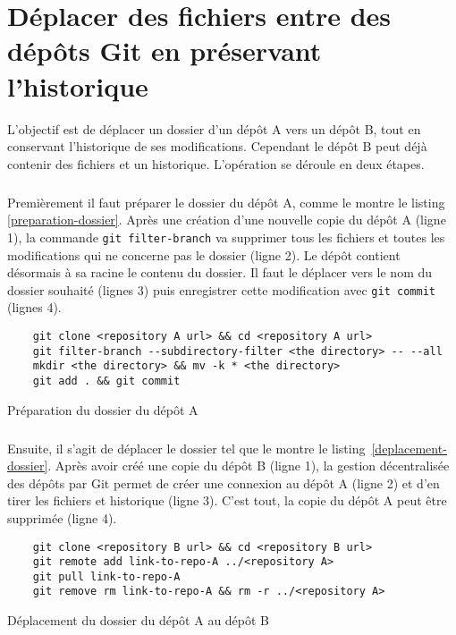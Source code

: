 \chapter[Déplacer des fichiers entre des dépôts Git en préservant l'historique]
  {Déplacer des fichiers entre des dépôts Git en préservant l'historique\footnotemark}
\label{deplacer-historique-depots}

  
L'objectif est de déplacer un dossier d'un dépôt A vers un dépôt B, tout en conservant
l'historique de ses modifications. Cependant le dépôt B peut déjà contenir des 
fichiers et un historique.
L'opération se déroule en deux étapes.

\paragraph{}
Premièrement il faut préparer le dossier du dépôt A, comme le montre le listing~
\ref{preparation-dossier}.
Après une création d'une nouvelle copie du dépôt A (ligne 1),
la commande \texttt{git filter-branch} va supprimer tous les fichiers et
toutes les modifications qui ne concerne pas le dossier (ligne 2). Le dépôt contient
désormais à sa racine le contenu du dossier. Il faut le déplacer vers le nom du
dossier souhaité (lignes 3) puis enregistrer cette modification avec \texttt{git commit} (lignes 4).
\begin{listing}
  \begin{verbatim}
    git clone <repository A url> && cd <repository A url>
    git filter-branch --subdirectory-filter <the directory> -- --all
    mkdir <the directory> && mv -k * <the directory>
    git add . && git commit
  \end{verbatim}
  \caption{Préparation du dossier du dépôt A}
  \label{preparation-dossier}
\end{listing}

\paragraph{}
Ensuite, il s'agit de déplacer le dossier tel que le montre le listing~\ref{deplacement-dossier}.
Après avoir créé une copie du dépôt B (ligne 1), la gestion décentralisée des dépôts
par Git permet de créer une connexion au dépôt A (ligne 2) et d'en tirer les fichiers
et historique (ligne 3). C'est tout, la copie du dépôt A peut être supprimée (ligne 4).
\begin{listing}
  \begin{verbatim}
    git clone <repository B url> && cd <repository B url>
    git remote add link-to-repo-A ../<repository A>
    git pull link-to-repo-A
    git remove rm link-to-repo-A && rm -r ../<repository A>
  \end{verbatim}
  \caption{Déplacement du dossier du dépôt A au dépôt B}
  \label{deplacement-dossier}
\end{listing}

